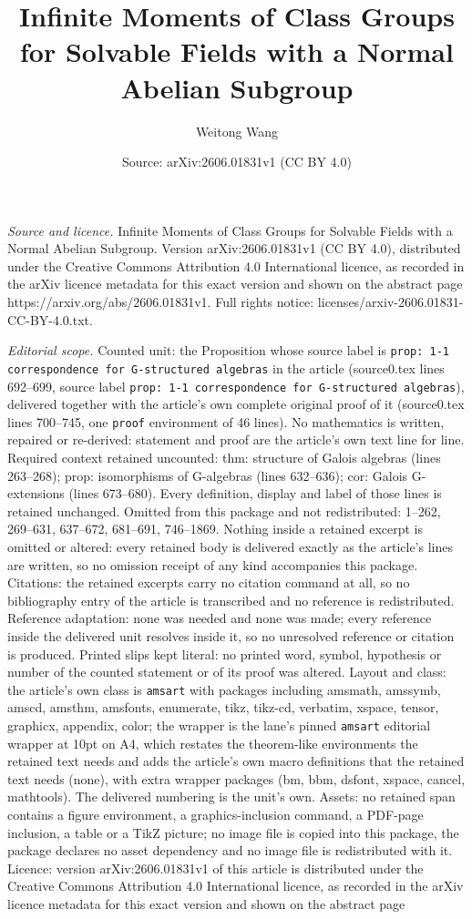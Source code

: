 \documentclass[10pt,a4paper]{amsart}
\title[Infinite Moments of Class Groups for Solvable Fields with a ]{Infinite Moments of Class Groups for Solvable Fields with a Normal Abelian Subgroup}
\author{Weitong Wang}
\date{Source: arXiv:2606.01831v1 (CC BY 4.0)}
\begin{document}
\maketitle

\noindent\emph{Source and licence.} Infinite Moments of Class Groups for Solvable Fields with a Normal Abelian Subgroup. Version arXiv:2606.01831v1 (CC BY 4.0), distributed under the Creative Commons Attribution 4.0 International licence, as recorded in the arXiv licence metadata for this exact version and shown on the abstract page https://arxiv.org/abs/2606.01831v1. Full rights notice: licenses/arxiv-2606.01831-CC-BY-4.0.txt.\par\smallskip

\noindent\textit{Editorial scope.} Counted unit: the Proposition whose source label is \texttt{prop: 1-1 correspondence for G-structured algebras} in the article (source0.tex lines 692--699, source label \texttt{prop: 1-1 correspondence for G-structured algebras}), delivered together with the article's own complete original proof of it (source0.tex lines 700--745, one \texttt{proof} environment of 46 lines). No mathematics is written, repaired or re-derived: statement and proof are the article's own text line for line. Required context retained uncounted: thm: structure of Galois algebras (lines 263--268); prop: isomorphisms of G-algebras (lines 632--636); cor: Galois G-extensions (lines 673--680). Every definition, display and label of those lines is retained unchanged. Omitted from this package and not redistributed: 1--262, 269--631, 637--672, 681--691, 746--1869. Nothing inside a retained excerpt is omitted or altered: every retained body is delivered exactly as the article's lines are written, so no omission receipt of any kind accompanies this package. Citations: the retained excerpts carry no citation command at all, so no bibliography entry of the article is transcribed and no reference is redistributed. Reference adaptation: none was needed and none was made; every reference inside the delivered unit resolves inside it, so no unresolved reference or citation is produced. Printed slips kept literal: no printed word, symbol, hypothesis or number of the counted statement or of its proof was altered. Layout and class: the article's own class is \texttt{amsart} with packages including amsmath, amssymb, amscd, amsthm, amsfonts, enumerate, tikz, tikz-cd, verbatim, xspace, tensor, graphicx, appendix, color; the wrapper is the lane's pinned \texttt{amsart} editorial wrapper at 10pt on A4, which restates the theorem-like environments the retained text needs and adds the article's own macro definitions that the retained text needs (none), with extra wrapper packages (bm, bbm, dsfont, xspace, cancel, mathtools). The delivered numbering is the unit's own. Assets: no retained span contains a figure environment, a graphics-inclusion command, a PDF-page inclusion, a table or a TikZ picture; no image file is copied into this package, the package declares no asset dependency and no image file is redistributed with it. Licence: version arXiv:2606.01831v1 of this article is distributed under the Creative Commons Attribution 4.0 International licence, as recorded in the arXiv licence metadata for this exact version and shown on the abstract page 
\end{document}
